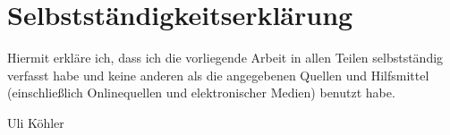 \documentclass[pdftex,a4paper,titlepage,12pt]{scrartcl}
\newtheorem[L]{boxedDefinition}{Definition}
\begin{document}
\section{Selbstständigkeitserklärung}
Hiermit erkläre ich, dass ich die vorliegende Arbeit in allen Teilen selbstständig verfasst habe und keine anderen als die angegebenen Quellen und Hilfsmittel (einschließlich Onlinequellen und elektronischer Medien) benutzt habe. 
\vfill
\begin{center}
\underline{\hspace{10cm}}\vspace{1cm}
\end{center}
\begin{center}
Uli Köhler
\end{center}
\vfill
\end{document}
